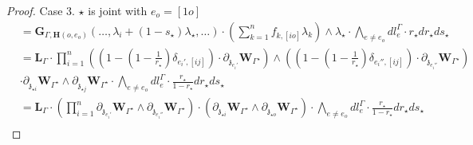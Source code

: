 \documentclass[11pt]{amsart}
\theoremstyle{definition}
\theoremstyle{remark}
\numberwithin{equation}{section}
\begin{document}
\begin{proof}
Case 3.  $\star$ is joint with $e_o=[1o]$
\begin{align*}
   & =\mathbf{G}_{\Gamma,\mathbf{H}(o,e_o)}(\dots,\lambda_i+(1-s_{\star})\lambda_{\star},\dots)\cdot(\sum\limits_{k=1}^{n}f_{k,[io]}\lambda_k)\wedge \lambda_{\star }\cdot\bigwedge_{e\neq e_{o}}dl^{\Gamma}_{e} \cdot r_{\star}dr_{\star}ds_{\star}\\
&=\mathbf{L}_{\Gamma}\cdot\prod^n_{i=1}\left((1-(1-\frac{1}{r_{\star}})\delta_{e_i',[ij]})\cdot\partial_{\mathfrak{z}_{e_i'}}\mathbf{W}_{\Gamma^{\star}}\right)\wedge\left((1-(1-\frac{1}{r_{\star}})\delta_{e_i'',[ij]})\cdot\partial_{\mathfrak{z}_{e_i''}}\mathbf{W}_{\Gamma^{\star}}\right)\\
   &\cdot  \partial_{\mathfrak{z}_{\star i}}\mathbf{W}_{\Gamma^{\star}}\wedge \partial_{\mathfrak{z}_{\star j}}\mathbf{W}_{\Gamma^{\star}}\cdot \bigwedge_{e\neq e_{o}}dl^{\Gamma}_{e}\cdot  \frac{ r_{\star}}{1- r_{\star}} dr_{\star}ds_{\star}\\
     &=\mathbf{L}_{\Gamma}\cdot\left(\prod^n_{i=1}\partial_{\mathfrak{z}_{e_i'}}\mathbf{W}_{\Gamma^{\star}}\wedge\partial_{\mathfrak{z}_{e_i''}}\mathbf{W}_{\Gamma^{\star}}\right)\cdot  \left( \partial_{\mathfrak{z}_{\star i}}\mathbf{W}_{\Gamma^{\star}}\wedge \partial_{\mathfrak{z}_{\star o}}\mathbf{W}_{\Gamma^{\star}}\right)\cdot \bigwedge_{e\neq e_{o}}dl^{\Gamma}_{e}\cdot  \frac{r_{\star}}{1- r_{\star}} dr_{\star}ds_{\star}\\
    \end{align*}


\end{proof}
\end{document}

